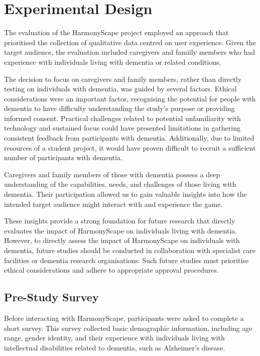 \documentclass{l4proj}
\begin{document}
\section{Experimental Design}
The evaluation of the HarmonyScape project employed an approach that prioritised the collection of qualitative data centred on user experience. Given the target audience, the evaluation included caregivers and famiily members who had experience with individuals living with dementia or related conditions.

The decision to focus on caregivers and family members, rather than directly testing on individuals with dementia, was guided by several factors. Ethical considerations were an important factor, recognising the potential for people with dementia to have difficulty understanding the study's purpose or providing informed consent. Practical challenges related to potential unfamiliarity with technology and sustained focus could have presented limitations in gathering consistent feedback from participants with dementia. Additionally, due to limited resources of a student project, it would have proven difficult to recruit a sufficient number of participants with dementia.

Caregivers and family members of those with dementia possess a deep understanding of the capabilities, needs, and challenges of those living with dementia. Their participation allowed us to gain valuable insights into how the intended target audience might interact with and experience the game.

These insights provide a strong foundation for future research that directly evaluates the impact of HarmonyScape on individuals living with dementia. However, to directly assess the impact of HarmonyScape on individuals with dementia, future studies should be conducted in collaboration with specialist care facilities or dementia research organisations. Such future studies must prioritise ethical considerations and adhere to appropriate approval procedures.

\subsection{Pre-Study Survey}
Before interacting with HarmonyScape, participants were asked to complete a short survey. This survey collected basic demographic information, including age range, gender identity, and their experience with individuals living with intellectual disabilities related to dementia, such as Alzheimer's disease.
\end{document}
